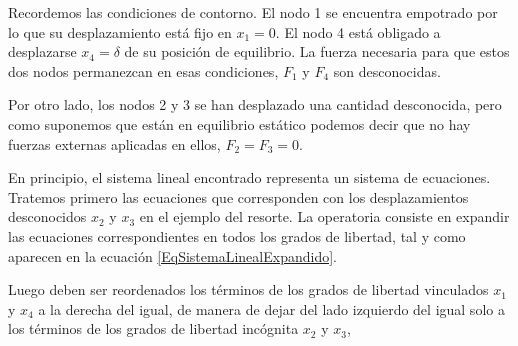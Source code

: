 
Recordemos las condiciones de contorno. El nodo 1 se encuentra empotrado por lo
que su desplazamiento está fijo en $x_1=0$. El nodo 4 está obligado a
desplazarse $x_4 = \delta$ de su posición de equilibrio.  La fuerza necesaria
para que estos dos nodos permanezcan en esas condiciones, $F_1$ y $F_4$ son
desconocidas. 

Por otro lado, los nodos 2 y 3 se han desplazado una cantidad desconocida, pero
como suponemos que están en equilibrio estático podemos decir que no hay
fuerzas externas aplicadas en ellos, $F_2 = F_3 = 0$.

En principio, el sistema lineal encontrado representa un sistema de ecuaciones.
Tratemos primero las ecuaciones que corresponden con los desplazamientos
desconocidos $x_2$ y $x_3$ en el ejemplo del resorte. La operatoria consiste en
expandir las ecuaciones correspondientes en todos los grados de libertad, tal y
como aparecen en la ecuación \ref{EqSistemaLinealExpandido}.

Luego deben ser reordenados los términos de los grados de libertad vinculados
$x_1$ y $x_4$ a la derecha del igual, de manera de dejar del lado izquierdo del
igual solo a los términos de los grados de libertad incógnita $x_2$ y $x_3$, 

\mode*

